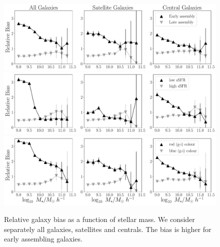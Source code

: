 \documentclass[fleqn,usenatbib]{mnras}
\begin{document}
\begin{figure}
    \centering
    \includegraphics[width=1.8\columnwidth]{figuras/bias_galaxies.pdf}
    \includegraphics[width=1.8\columnwidth]{figuras/ssfr_bias_galaxies.pdf}
    \includegraphics[width=1.8\columnwidth]{figuras/color_bias_galaxies.pdf}
    \caption{Relative galaxy bias as a function of stellar mass.
    We consider separately all galaxies, satellites and centrals.
    The bias is higher for early assembling galaxies.}
    \label{fig:galaxy_bias}
\end{figure}
\end{document}
